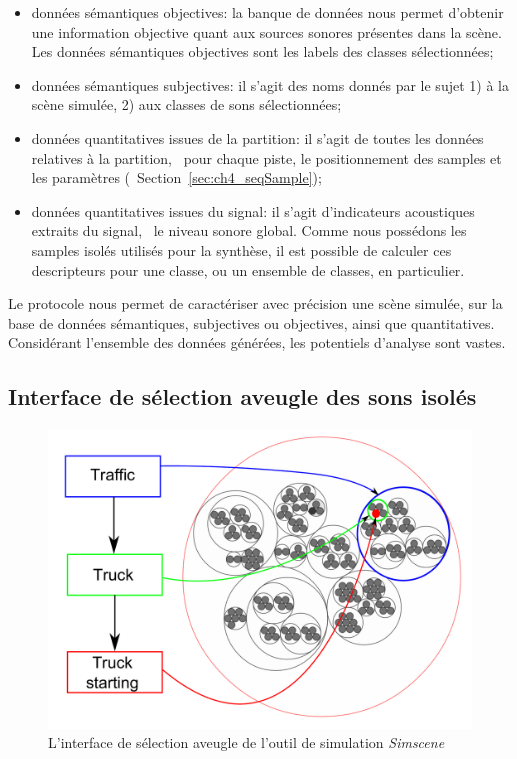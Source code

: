 \begin{itemize}
\item données sémantiques objectives: la banque de données nous permet d'obtenir une information objective quant aux sources sonores présentes dans la scène. Les données sémantiques objectives sont les labels des classes sélectionnées;
\item données sémantiques subjectives: il s'agit des noms donnés par le sujet 1) à la scène simulée, 2) aux classes de sons sélectionnées;
\item données quantitatives issues de la partition: il s'agit de toutes les données relatives à la partition, \ie~pour chaque piste, le positionnement des samples et les paramètres (\cf~Section~\ref{sec:ch4_seqSample});
\item données quantitatives issues du signal: il s'agit d'indicateurs acoustiques extraits du signal, \eg~le niveau sonore global. Comme nous possédons les samples isolés utilisés pour la synthèse, il est possible de calculer ces descripteurs pour une classe, ou un ensemble de classes, en particulier.
\end{itemize}

Le protocole nous permet de caractériser avec précision une scène simulée, sur la base de données sémantiques, subjectives ou objectives, ainsi que quantitatives. Considérant l'ensemble des données générées, les potentiels d'analyse sont vastes.



\subsection{Interface de sélection aveugle des sons isolés}
\label{sec:ch4_ssf}

\begin{figure}[t]
        \myfloatalign
        \includegraphics[width=.8\linewidth]{gfx/SSF}
       \caption{L'interface de sélection aveugle de l'outil de simulation \emph{Simscene}}\label{fig:ssf}
\end{figure}

